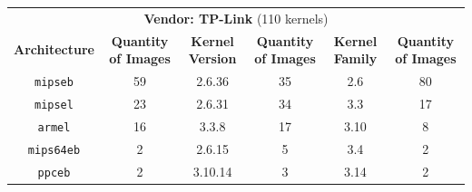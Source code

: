 \begin{table}[H]
{\begin{tabular}{cccccc}
\multicolumn{6}{c}{\textbf{Vendor: TP-Link} (110 kernels)}                                                                    \\
\textbf{Architecture} & \multicolumn{1}{c|}{\textbf{Quantity of Images}} & \textbf{Kernel Version} & \multicolumn{1}{c|}{\textbf{Quantity of Images}} & \textbf{Kernel Family} & \textbf{Quantity of Images} \\ \hline
{\tt mipseb}            & \multicolumn{1}{c|}{59}                & 2.6.36                  & \multicolumn{1}{c|}{35}                          & 2.6                     & 80                         \\
{\tt mipsel}            & \multicolumn{1}{c|}{23}                & 2.6.31                  & \multicolumn{1}{c|}{34}                          & 3.3                     & 17                         \\
{\tt armel}             & \multicolumn{1}{c|}{16}                & 3.3.8                   & \multicolumn{1}{c|}{17}                          & 3.10                    & 8                          \\
{\tt mips64eb}          & \multicolumn{1}{c|}{2}                 & 2.6.15                  & \multicolumn{1}{c|}{5}                           & 3.4                     & 2                          \\
{\tt ppceb}             & \multicolumn{1}{c|}{2}                 & 3.10.14                 & \multicolumn{1}{c|}{3}                           & 3.14                    & 2                          \\ \hline


\end{tabular}}
\end{table}
